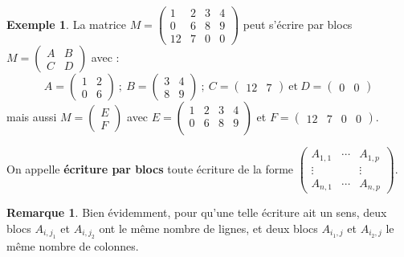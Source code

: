 \documentclass[french]{article}
\theoremstyle{plain}
\theoremstyle{definition}
\newtheorem*{ex}{Exemple}
\newtheorem*{rmq}{Remarque}
\theoremstyle{remark}
\begin{document}
\begin{ex}
	La matrice $M=\begin{pmatrix}
		1&2&3&4\\
		0&6&8&9\\
		12&7&0&0
	\end{pmatrix}$ peut s'écrire par blocs $M=\begin{pmatrix}
	A&B\\
	C&D
	\end{pmatrix}$ avec :
	$$A=\begin{pmatrix}
		1&2\\
		0&6
	\end{pmatrix}\ ;\ B=\begin{pmatrix}
	3&4\\
	8&9
	\end{pmatrix}\ ;\ C=\begin{pmatrix}
	12&7
	\end{pmatrix}\ \text{et}\ D=\begin{pmatrix}
	0&0
	\end{pmatrix}$$
	mais aussi $M=\begin{pmatrix}
		E\\
		F
	\end{pmatrix}$ avec $E=\begin{pmatrix}
	1&2&3&4\\
	0&6&8&9\\
	\end{pmatrix}$ et $F=\begin{pmatrix}
	12&7&0&0
	\end{pmatrix}$.
\end{ex}

On appelle \textbf{écriture par blocs} toute écriture de la forme $\begin{pmatrix}
	A_{1,1}&\cdots&A_{1,p}\\
	\vdots&&\vdots\\
	A_{n,1}&\cdots&A_{n,p}
\end{pmatrix}$.

\begin{rmq}
	Bien évidemment, pour qu'une telle écriture ait un sens, deux blocs $A_{i,j_1}$ et $A_{i,j_2}$ ont le même nombre de lignes, et deux blocs $A_{i_1,j}$ et $A_{i_2,j}$ le même nombre de colonnes.
\end{rmq}
\end{document}
